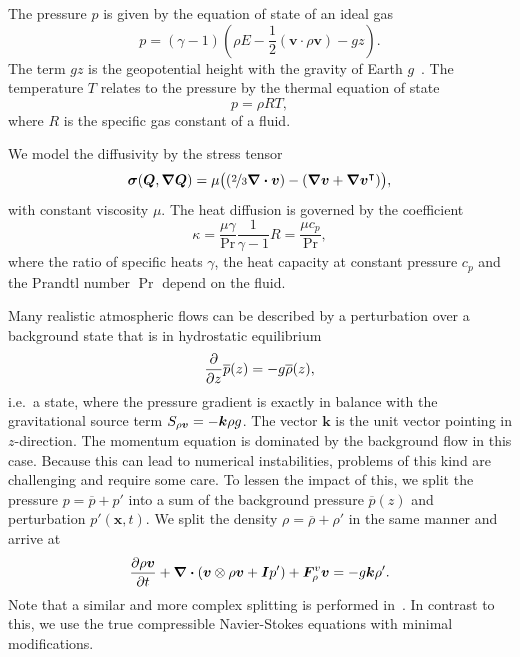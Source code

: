 \documentclass[runningheads]{llncs}
\newcommand{\Q}{\bm{Q}}
\newcommand{\gradQ}{\gradient{\Q}}
\newcommand{\Qrho}{\rho}
\newcommand{\Qj}{\rho \bm{v}}
\newcommand{\Qv}{\bm{v}}
\newcommand{\QE}{\rho E}
\newcommand{\stressT}{\bm{\sigma}}
\newcommand{\pressure}{p}
\newcommand{\flux}{\bm{F}}
\newcommand{\viscFlux}{\flux^{v}}
\newcommand{\source}[1][]{
  \notblank{#1}{
S_{#1}
}{
\bm{S}
}
}
\begin{document}
The pressure $\pressure$ is given by the equation of state of an ideal gas
\begin{equation}
  \label{eq:eos}
  \pressure = (\gamma - 1) \left(\QE - \frac{1}{2} \left(\Qv \cdot \Qj \right) - gz \right).
\end{equation}
The term $gz$ is the geopotential height with the gravity of Earth $g$~\cite{giraldo2008study}.
The temperature $T$ relates to the pressure by the thermal equation of state
\begin{equation}
  \label{eq:temperature}
  \pressure = \Qrho R T,
\end{equation}
where $R$ is the specific gas constant of a fluid.

We model the diffusivity by the stress tensor
\begin{equation}
  \label{eq:stress-tensor}
  \stressT(\Q, \gradQ) =
  \mu
  \bigl(
  \left(\nicefrac{2}{3} \divergence{\Qv} \right) -
  \left( \gradient{\Qv} + \gradient{\Qv}^\intercal \right)
  \bigr),
\end{equation}
with constant viscosity $\mu$.
The heat diffusion is governed by the coefficient
\begin{equation}
  \label{eq:heat-conduction-coeff}
  \kappa = \frac{\mu \gamma}{\Pr} \frac{1}{\gamma - 1} R = \frac{\mu c_p}{\Pr},
\end{equation}
where the ratio of specific heats $\gamma$, the heat capacity at constant pressure $c_p$ and the Prandtl number $\Pr$ depend on the fluid.

Many realistic atmospheric flows can be described by a perturbation over a background state that is in hydrostatic equilibrium
\newcommand{\backgroundPressure}{\overline{\pressure}}
\newcommand{\backgroundRho}{\overline{\Qrho}}
\begin{equation}
  \label{eq:hydrostatic-balance}
  \pdv{}{z} \backgroundPressure{\left (z \right )} = -g \backgroundRho(z),
\end{equation}
i.e.\ a state, where the pressure gradient is exactly in balance with the gravitational source term $\source[\Qj] = - \bm{k} \Qrho g$.
The vector $\bm{k}$ is the unit vector pointing in $z$-direction.
The momentum equation is dominated by the background flow in this case.
Because this can lead to numerical instabilities, problems of this kind are challenging and require some care.
To lessen the impact of this, we split the pressure $\pressure = \backgroundPressure + \pressure'$ into a sum of the background pressure $\backgroundPressure(z)$ and perturbation $\pressure'(\bm{x}, t)$.
We split the density $\Qrho = \backgroundRho + \Qrho'$ in the same manner and arrive at
\begin{equation}
  \label{eq:momentum-equation-split}
  \pdv{\Qj}{t}+ \divergence{ \left(
    \Qv \otimes \Qj + \bm{I} \pressure'
    \right)
  } + \viscFlux_\Qj
  =
  -g \bm{k} \Qrho'.
\end{equation}
Note that a similar and more complex splitting is performed in~\cite{muller2010adaptive,giraldo2008study}.
In contrast to this, we use the true compressible Navier-Stokes equations with minimal modifications.
\end{document}
